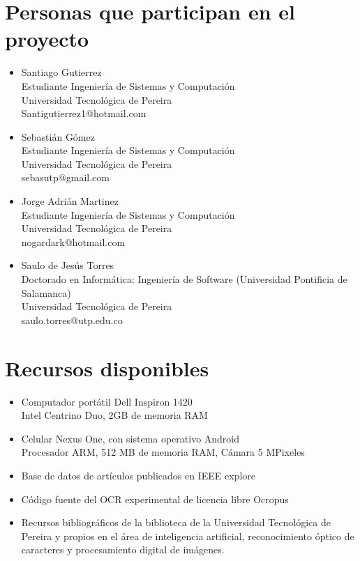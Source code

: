 \documentclass[a4paper, 11pt, oneside]{article}
\begin{document}
	\section{Personas que participan en el proyecto}
	\begin{itemize}
   \item Santiago Gutierrez\\
Estudiante Ingeniería de Sistemas y Computación\\
Universidad Tecnológica de Pereira\\
Santigutierrez1@hotmail.com
   \item Sebastián Gómez\\
Estudiante Ingeniería de Sistemas y Computación\\
Universidad Tecnológica de Pereira\\
sebasutp@gmail.com
   \item Jorge Adrián Martinez\\
Estudiante Ingeniería de Sistemas y Computación\\
Universidad Tecnológica de Pereira\\
nogardark@hotmail.com
   \item Saulo de Jesús Torres\\
Doctorado en Informática: Ingeniería de Software (Universidad Pontificia de Salamanca)\\
Universidad Tecnológica de Pereira\\
saulo.torres@utp.edu.co
	\end{itemize}
	\clearpage
	
	\section{Recursos disponibles}
	\begin{itemize}
		\item Computador portátil Dell Inspiron 1420\\
			Intel Centrino Duo, 2GB de memoria RAM
		\item Celular Nexus One, con sistema operativo Android\\
			Procesador ARM, 512 MB de memoria RAM, Cámara 5 MPixeles
		\item Base de datos de artículos publicados en IEEE explore
		\item Código fuente del OCR experimental de licencia libre Ocropus
	    \item Recursos bibliográficos de la biblioteca de la Universidad Tecnológica de Pereira y propios en el área de inteligencia artificial, reconocimiento óptico de caracteres y procesamiento digital de imágenes.
	\end{itemize}
	
\end{document}
